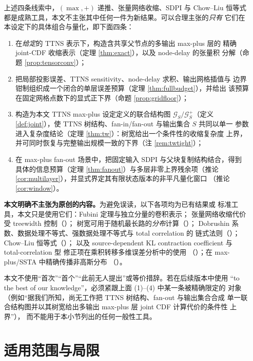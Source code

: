 \documentclass[a4paper,11pt]{article}
\theoremstyle{definition}
\newcommand{\1}{\mathbf 1}
\newcommand{\Gcal}{\mathcal G}
\begin{document}
上述四条线索中，$(\max,+)$ 递推、张量网络收缩、SDPI 与 Chow--Liu 恒等式
都是成熟工具，本文不主张其中任何一件为新结果。可以合理主张的\emph{只有}
它们在本设定下的具体组合与量化，即下面四条：
\begin{enumerate}[label=(\arabic*)]
\item 在\emph{给定}的 TTNS 表示下，构造含共享父节点的多输出 max-plus 层的
精确 joint-CDF 收缩表示（定理 \ref{thm:exact}），以及 node-delay 的张量积
分解（命题 \ref{prop:tensorconv}）；
\item 把局部投影误差、TTNS sensitivity、node-delay 求积、输出网格插值与
边界钳制组织成一个闭合的单层误差预算（定理 \ref{thm:fullbudget}），并给出
该预算在固定网格点数下的显式正下界（命题 \ref{prop:gridfloor}）；
\item 构造为本文 TTNS max-plus 设定定义的联合结构图 $\Gcal_S/\Gcal_S^{+}$（定义
\ref{def:joint}），使 TTNS 树结构、fan-in/fan-out 与输出集合 $S$ 共同以单一
参数进入复杂度结论（定理 \ref{thm:tw}）：树宽给出一个条件性的收缩复杂度
上界，并可同时恢复与完整输出规模一致的下界（注 \ref{rem:twtight}）；
\item 在 max-plus fan-out 场景中，把固定输入 SDPI 与父块复制结构结合，得到
具体的信息预算（定理 \ref{thm:fanout}）与多层非零上界残余项（推论
\ref{cor:multilayer}），并显式界定其有限状态版本的非平凡量化窗口
（推论 \ref{cor:window}）。
\end{enumerate}

\textbf{本文明确不主张为原创的内容。}为避免误读，以下各项均为已有结果或
标准工具，本文只是使用它们：Fubini 定理与独立分量的卷积表示；
张量网络收缩代价受 treewidth 控制（\cite{RobevaSeigal2019,RoaVillescas2024}）；
树宽可用于随机最长路的\emph{分布}计算（\cite{Ando2019,Ando2026}）；
Dobrushin 系数、数据处理不等式、强数据处理不等式与 total correlation 的
链式法则（\cite{Cohen1993,PolyanskiyWu2016,PolyanskiyWu2017,Raginsky2016,Watanabe1960}）；
Chow--Liu 恒等式（\cite{ChowLiu1968}）；
以及 source-dependent KL contraction coefficient 与 total-correlation 型
修正项在乘积转移多维误差分析中的使用
（\cite{Yuan2026,Dmitriev2026}）；在 max-plus/SSTA 中精确传播非高斯分布
（\cite{Mishagli2024}）。

本文不使用“首次”“首个”“此前无人提出”或等价措辞。若在后续版本中使用
``to the best of our knowledge''，必须紧跟上面 (1)--(4) 中某一条被精确限定的
对象（例如“据我们所知，尚无工作把 TTNS 树结构、fan-out 与输出集合合成
单一联合结构图并以其树宽给出多输出 max-plus 层 joint CDF 计算代价的条件性
上界”），
而不能用于本小节列出的任何一般性工具。

\section{适用范围与局限}
\label{sec:limits}
\end{document}
